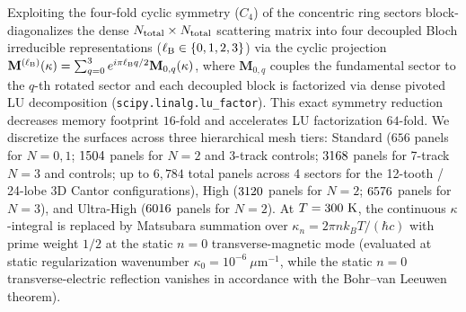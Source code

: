\documentclass[pdflatex,sn-nature]{sn-jnl}
\begin{document}
Exploiting the four-fold cyclic symmetry ($C_4$) of the concentric ring sectors block-diagonalizes the dense $N_{\rm total} \times N_{\rm total}$ scattering matrix into four decoupled Bloch irreducible representations ($\ell_{\rm B} \in \{0, 1, 2, 3\}$) via the cyclic projection $\mathbf{M}^{(\ell_{\rm B})}(\kappa) = \sum_{q=0}^{3} e^{i\pi \ell_{\rm B} q/2}\mathbf{M}_{0,q}(\kappa)$, where $\mathbf{M}_{0,q}$ couples the fundamental sector to the $q$-th rotated sector and each decoupled block is factorized via dense pivoted LU decomposition (\texttt{scipy.linalg.lu\_factor}). This exact symmetry reduction decreases memory footprint $16$-fold and accelerates LU factorization $64$-fold. We discretize the surfaces across three hierarchical mesh tiers: Standard ($656$ panels for $N=0,1$; $1504{}$ panels for $N=2$ and 3-track controls; $3168{}$ panels for 7-track $N=3$ and controls; up to $6{,}784$ total panels across 4 sectors for the 12-tooth / 24-lobe 3D Cantor configurations), High ($3120{}$ panels for $N=2$; $6576{}$ panels for $N=3$), and Ultra-High ($6016{}$ panels for $N=2$). At $T = 300{}\text{ K}$, the continuous $\kappa$-integral is replaced by Matsubara summation over $\kappa_n = 2\pi n k_B T / (\hbar c)$ with prime weight $1/2$ at the static $n=0$ transverse-magnetic mode (evaluated at static regularization wavenumber $\kappa_0 = 10^{-6}\ \mu\text{m}^{-1}$, while the static $n=0$ transverse-electric reflection vanishes in accordance with the Bohr--van Leeuwen theorem).
\end{document}
